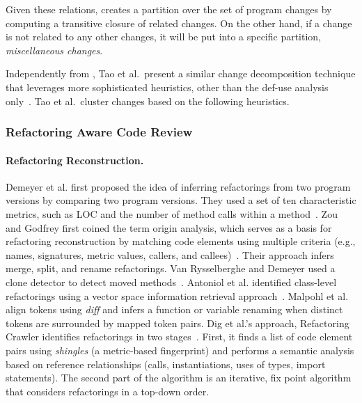 \documentclass[runningheads,a4paper]{llncs}
\begin{document}
Given these relations, {\clusterchanges} creates a partition over the set of program changes by computing a transitive closure of related changes. On the other hand, if a change is not related to any other changes, it will be put into a specific partition, {\em miscellaneous changes}.

Independently from {\clusterchanges}, Tao et al.~present a similar change decomposition technique that leverages more sophisticated heuristics, other than the def-use analysis only~\cite{tao2015partitioning}. Tao et al.~cluster changes based on the following heuristics.

\subsubsection{Refactoring Aware Code Review} 

\paragraph{Refactoring Reconstruction.}  
Demeyer {et al.} first proposed the idea of inferring refactorings from two program versions by comparing two program versions. They used a set of ten characteristic metrics, such as LOC and the number of method calls within a method~\cite{Demeyer2000}. Zou and Godfrey first coined the term origin analysis, which serves as a basis for refactoring reconstruction by matching code elements using multiple criteria (e.g., names, signatures, metric values, callers, and callees)~\cite{Zou2005}. Their approach infers merge, split, and rename refactorings. Van Rysselberghe and Demeyer used a clone detector to detect moved methods~\cite{Rysselberghe2003}.  Antoniol {et al.} identified class-level refactorings using a vector space information retrieval approach~\cite{Antoniol2004}. Malpohl {et al.} \cite{Malpohl2000} align tokens using {\it diff} and infers a function or variable renaming when distinct tokens are surrounded by mapped token pairs. Dig et al.'s approach, {Refactoring Crawler} identifies refactorings in two stages~\cite{Dig2006}. First, it finds a list of code element pairs using {\em shingles} (a metric-based fingerprint) and performs a semantic analysis based on reference relationships (calls, instantiations, uses of types, import statements). The second part of the algorithm is an iterative, fix point algorithm that considers refactorings in a top-down order. 
\end{document}
